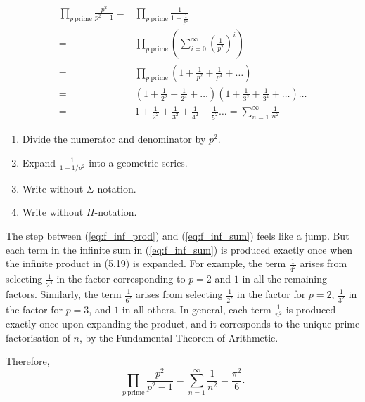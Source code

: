 \documentclass[a4paper, 12pt]{article}
\theoremstyle{definition}
\begin{document}
\begin{align}
  \prod_{p\ \text{prime}} \frac{p^2}{p^2-1} =& \prod_{p\ \text{prime}} \frac{1}{1-\frac{1}{p^2}}\\
  =& \prod_{p\ \text{prime}} \left(\sum_{i=0}^{\infty} \left(\frac{1}{p^2}\right)^i\right)\\
  =& \prod_{p\ \text{prime}} \left(1 + \frac{1}{p^2} + \frac{1}{p^4} + \dots\right)\\
  =& \left(1 + \frac{1}{2^2} + \frac{1}{2^4} + \dots\right)
  \left(1 + \frac{1}{3^2} + \frac{1}{3^4} + \dots\right)
  \dots \label{eq:f_inf_prod} \\
  =& 1 + \frac{1}{2^2} + \frac{1}{3^2} + \frac{1}{4^2} + \frac{1}{5^2}\dots
  = \sum_{n=1}^{\infty}\frac{1}{n^2} \label{eq:f_inf_sum}
\end{align}
\vspace{-1em}\begin{enumerate}[label=(5.\arabic*), start=15]
  \item Divide the numerator and denominator by $p^2$.
  \item Expand $\frac{1}{1-1/p^2}$ into a geometric series.
  \item Write without $\Sigma$-notation.
  \item Write without $\Pi$-notation.
\end{enumerate}
The step between (\ref{eq:f_inf_prod}) and (\ref{eq:f_inf_sum}) feels like a jump.
But each term in the infinite sum in (\ref{eq:f_inf_sum}) is produced exactly once
when the infinite product in (5.19) is expanded.
For example, the term $\tfrac{1}{4^2}$ arises from selecting $\tfrac{1}{2^4}$ in the factor corresponding to $p=2$ 
and $1$ in all the remaining factors. 
Similarly, the term $\tfrac{1}{6^2}$ arises from selecting $\tfrac{1}{2^2}$ in the factor for $p=2$, 
$\tfrac{1}{3^2}$ in the factor for $p=3$, and $1$ in all others. 
In general, each term $\tfrac{1}{n^2}$ is produced exactly once upon expanding the product,
and it corresponds to the unique prime factorisation of $n$, by the Fundamental Theorem of Arithmetic.

Therefore,
\begin{equation}
  \prod_{p\ \text{prime}} \frac{p^2}{p^2-1}
  = \sum_{n=1}^{\infty}\frac{1}{n^2}
  = \frac{\pi^2}{6}.
\end{equation}
\end{document}
